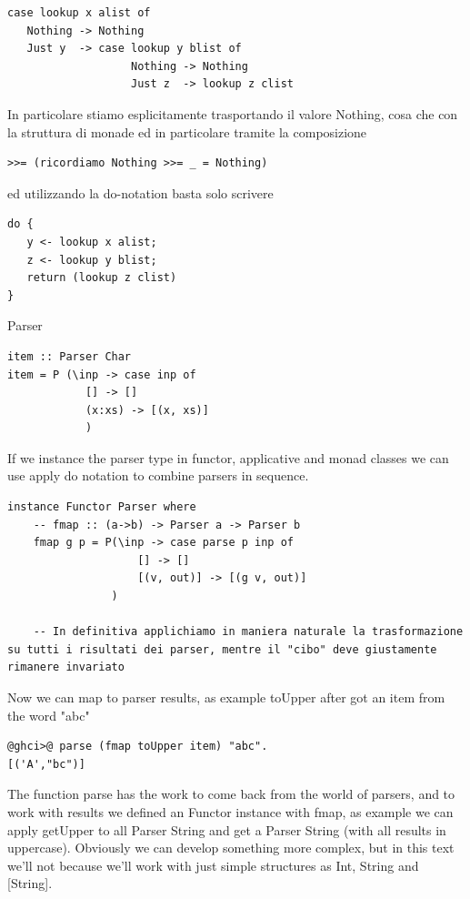 \documentclass[a4papert]{article}
\begin{document}
\begin{lstlisting}[style=haskellstyle]
case lookup x alist of
   Nothing -> Nothing
   Just y  -> case lookup y blist of
                   Nothing -> Nothing
                   Just z  -> lookup z clist
\end{lstlisting}


In particolare stiamo esplicitamente trasportando il valore Nothing, cosa che con la struttura di monade ed in particolare tramite la composizione 


\begin{lstlisting}[style=haskellstyle]
>>= (ricordiamo Nothing >>= _ = Nothing)
\end{lstlisting}


ed utilizzando la do-notation basta solo scrivere


\begin{lstlisting}[style=haskellstyle]
do {
   y <- lookup x alist;
   z <- lookup y blist;
   return (lookup z clist)
}
\end{lstlisting}


Parser 

\begin{lstlisting}[style=haskellstyle]
item :: Parser Char
item = P (\inp -> case inp of
            [] -> []
            (x:xs) -> [(x, xs)]
            )

\end{lstlisting}
If we instance the parser type in functor, applicative and monad classes we can use apply do notation to combine parsers in sequence.

\begin{lstlisting}[style=haskellstyle]
instance Functor Parser where
    -- fmap :: (a->b) -> Parser a -> Parser b
    fmap g p = P(\inp -> case parse p inp of
                    [] -> []
                    [(v, out)] -> [(g v, out)]
                )

    -- In definitiva applichiamo in maniera naturale la trasformazione su tutti i risultati dei parser, mentre il "cibo" deve giustamente rimanere invariato

\end{lstlisting}
Now we can map to parser results, as example toUpper after got an item from the word "abc"


\begin{lstlisting}[style=ghcistyle]
@ghci>@ parse (fmap toUpper item) "abc".
[('A',"bc")]
\end{lstlisting}


The function parse has the work to come back from the world of parsers, and to work with results we defined an Functor instance with fmap, as example we can apply getUpper to all Parser String and get a Parser String (with all results in uppercase). Obviously we can develop something more complex, but in this text we'll not because we'll work with just simple structures as Int, String and [String].
\end{document}
